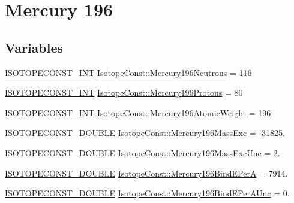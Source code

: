 \hypertarget{group___isotope_const-_mercury-_hg196}{}\section{Mercury 196}
\label{group___isotope_const-_mercury-_hg196}
\subsection*{Variables}
\begin{DoxyCompactItemize}
\item 
\mbox{\hyperlink{group___isotope_const-_macros_ga5f18360b3e99483a35c32d789e62621c}{I\+S\+O\+T\+O\+P\+E\+C\+O\+N\+S\+T\+\_\+\+I\+NT}} \mbox{\hyperlink{group___isotope_const-_mercury-_hg196_ga0ce7c6a9947a4b28180b8a1f8f0d9050}{Isotope\+Const\+::\+Mercury196\+Neutrons}} = 116
\item 
\mbox{\hyperlink{group___isotope_const-_macros_ga5f18360b3e99483a35c32d789e62621c}{I\+S\+O\+T\+O\+P\+E\+C\+O\+N\+S\+T\+\_\+\+I\+NT}} \mbox{\hyperlink{group___isotope_const-_mercury-_hg196_gae108bae39ff0270cfdb4c59f2c3948c7}{Isotope\+Const\+::\+Mercury196\+Protons}} = 80
\item 
\mbox{\hyperlink{group___isotope_const-_macros_ga5f18360b3e99483a35c32d789e62621c}{I\+S\+O\+T\+O\+P\+E\+C\+O\+N\+S\+T\+\_\+\+I\+NT}} \mbox{\hyperlink{group___isotope_const-_mercury-_hg196_ga6332cbf8736486ec639e3540fa054959}{Isotope\+Const\+::\+Mercury196\+Atomic\+Weight}} = 196
\item 
\mbox{\hyperlink{group___isotope_const-_macros_ga8f45a7272ce02c0b4c65c44636ed719a}{I\+S\+O\+T\+O\+P\+E\+C\+O\+N\+S\+T\+\_\+\+D\+O\+U\+B\+LE}} \mbox{\hyperlink{group___isotope_const-_mercury-_hg196_ga85898365a84521449281bafbb569876e}{Isotope\+Const\+::\+Mercury196\+Mass\+Exc}} = -\/31825.
\item 
\mbox{\hyperlink{group___isotope_const-_macros_ga8f45a7272ce02c0b4c65c44636ed719a}{I\+S\+O\+T\+O\+P\+E\+C\+O\+N\+S\+T\+\_\+\+D\+O\+U\+B\+LE}} \mbox{\hyperlink{group___isotope_const-_mercury-_hg196_ga435b7cda53d96e75f505e72fe8af39d0}{Isotope\+Const\+::\+Mercury196\+Mass\+Exc\+Unc}} = 2.
\item 
\mbox{\hyperlink{group___isotope_const-_macros_ga8f45a7272ce02c0b4c65c44636ed719a}{I\+S\+O\+T\+O\+P\+E\+C\+O\+N\+S\+T\+\_\+\+D\+O\+U\+B\+LE}} \mbox{\hyperlink{group___isotope_const-_mercury-_hg196_ga35f475c1f3e12b8e05f0ba33cd309372}{Isotope\+Const\+::\+Mercury196\+Bind\+E\+PerA}} = 7914.
\item 
\mbox{\hyperlink{group___isotope_const-_macros_ga8f45a7272ce02c0b4c65c44636ed719a}{I\+S\+O\+T\+O\+P\+E\+C\+O\+N\+S\+T\+\_\+\+D\+O\+U\+B\+LE}} \mbox{\hyperlink{group___isotope_const-_mercury-_hg196_ga64040aa93abcd6eef4bb815654d913c7}{Isotope\+Const\+::\+Mercury196\+Bind\+E\+Per\+A\+Unc}} = 0.

\end{DoxyCompactItemize}
